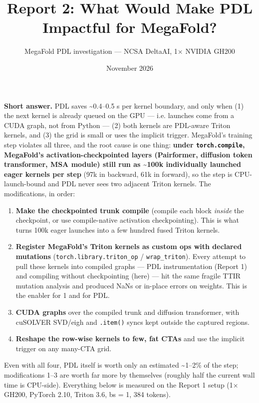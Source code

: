 \documentclass[10pt]{article}
\title{Report 2: What Would Make PDL Impactful for MegaFold?}
\author{MegaFold PDL investigation --- NCSA DeltaAI, 1$\times$ NVIDIA GH200}
\date{November 2026}
\begin{document}
\maketitle

\textbf{Short answer.} PDL saves \textasciitilde{}0.4--0.5 \textmu{}s per kernel boundary, and only when (1) the next kernel is already queued on the GPU --- i.e. launches come from a CUDA graph, not from Python --- (2) both kernels are PDL-aware Triton kernels, and (3) the grid is small or uses the implicit trigger. MegaFold's training step violates all three, and the root cause is one thing: \textbf{under \texttt{torch.compile}, MegaFold's activation-checkpointed layers (Pairformer, diffusion token transformer, MSA module) still run as \textasciitilde{}100k individually launched eager kernels per step} (97k in backward, 61k in forward), so the step is CPU-launch-bound and PDL never sees two adjacent Triton kernels. The modifications, in order:


\begin{enumerate}
\item \textbf{Make the checkpointed trunk compile} (compile each block \emph{inside} the checkpoint, or use compile-native activation checkpointing). This is what turns 100k eager launches into a few hundred fused Triton kernels.
\item \textbf{Register MegaFold's Triton kernels as custom ops with declared mutations} (\texttt{torch.library.triton\_op} / \texttt{wrap\_triton}). Every attempt to pull these kernels into compiled graphs --- PDL instrumentation (Report 1) and compiling without checkpointing (here) --- hit the same fragile TTIR mutation analysis and produced NaNs or in-place errors on weights. This is the enabler for 1 and for PDL.
\item \textbf{CUDA graphs} over the compiled trunk and diffusion transformer, with cuSOLVER SVD/eigh and \texttt{.item()} syncs kept outside the captured regions.
\item \textbf{Reshape the row-wise kernels to few, fat CTAs} and use the implicit trigger on any many-CTA grid.
\end{enumerate}

Even with all four, PDL itself is worth only an estimated \textasciitilde{}1--2\% of the step; modifications 1--3 are worth far more by themselves (roughly half the current wall time is CPU-side). Everything below is measured on the Report 1 setup (1$\times$ GH200, PyTorch 2.10, Triton 3.6, bs = 1, 384 tokens).
\end{document}
